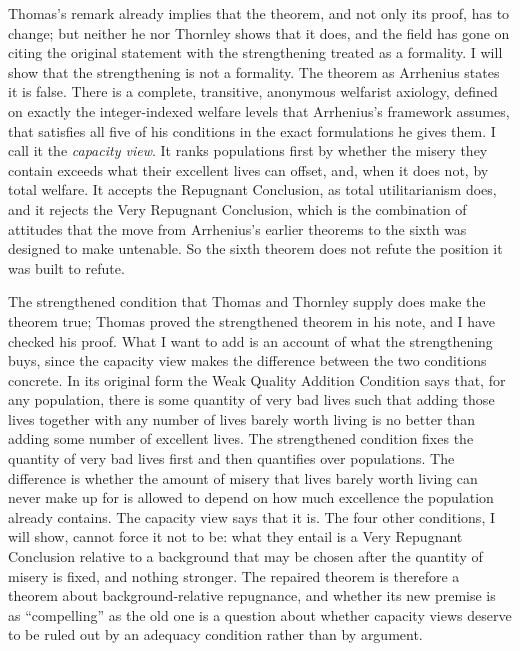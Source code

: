 \documentclass[
  11pt,
  letterpaper,
  DIV=11,
  numbers=noendperiod,
  twoside]{scrartcl}
\begin{document}
Thomas's remark already implies that the theorem, and not only its
proof, has to change; but neither he nor Thornley shows that it does,
and the field has gone on citing the original statement with the
strengthening treated as a formality. I will show that the strengthening
is not a formality. The theorem as Arrhenius states it is false. There
is a complete, transitive, anonymous welfarist axiology, defined on
exactly the integer-indexed welfare levels that Arrhenius's framework
assumes, that satisfies all five of his conditions in the exact
formulations he gives them. I call it the \emph{capacity view}. It ranks
populations first by whether the misery they contain exceeds what their
excellent lives can offset, and, when it does not, by total welfare. It
accepts the Repugnant Conclusion, as total utilitarianism does, and it
rejects the Very Repugnant Conclusion, which is the combination of
attitudes that the move from Arrhenius's earlier theorems to the sixth
was designed to make untenable. So the sixth theorem does not refute the
position it was built to refute.

The strengthened condition that Thomas and Thornley supply does make the
theorem true; Thomas proved the strengthened theorem in his note, and I
have checked his proof. What I want to add is an account of what the
strengthening buys, since the capacity view makes the difference between
the two conditions concrete. In its original form the Weak Quality
Addition Condition says that, for any population, there is some quantity
of very bad lives such that adding those lives together with any number
of lives barely worth living is no better than adding some number of
excellent lives. The strengthened condition fixes the quantity of very
bad lives first and then quantifies over populations. The difference is
whether the amount of misery that lives barely worth living can never
make up for is allowed to depend on how much excellence the population
already contains. The capacity view says that it is. The four other
conditions, I will show, cannot force it not to be: what they entail is
a Very Repugnant Conclusion relative to a background that may be chosen
after the quantity of misery is fixed, and nothing stronger. The
repaired theorem is therefore a theorem about background-relative
repugnance, and whether its new premise is as ``compelling'' as the old
one is a question about whether capacity views deserve to be ruled out
by an adequacy condition rather than by argument.
\end{document}
